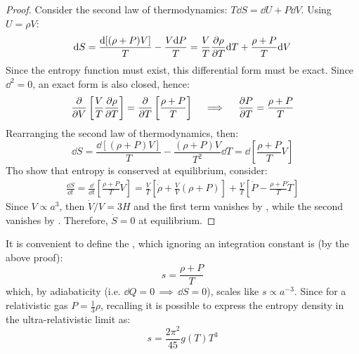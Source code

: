 \begin{proofbox}
  \begin{proof}
    Consider the second law of thermodynamics: $ T \dd S = \dd U + P \dd V $. Using $ U = \rho V $:
    \begin{equation*}
      \mathrm{d} S = \frac{\mathrm{d} [(\rho + P) V]}{T} - \frac{V \mathrm{d} P}{T} = \frac{V}{T} \frac{\partial \rho}{\partial T} \mathrm{d} T + \frac{\rho + P}{T} \mathrm{d} V
    \end{equation*}
    Since the entropy function must exist, this differential form must be exact. Since $ \dd^2 = 0 $, an exact form is also closed, hence:
    \begin{equation}
      \frac{\partial}{\partial V} \left[ \frac{V}{T} \frac{\partial \rho}{\partial T} \right] = \frac{\partial}{\partial T} \left[ \frac{\rho + P}{T} \right]
      \quad \implies \quad
      \frac{\partial P}{\partial T} = \frac{\rho + P}{T}
      \label{eq:pt-thermo}
    \end{equation}
    Rearranging the second law of thermodynamics, then:
    \begin{equation*}
      \dd S = \frac{\dd [(\rho + P) V]}{T} - \frac{(\rho + P) V}{T^2} \dd T = \dd \left[ \frac{\rho + P}{T} V \right]
    \end{equation*}
    Tho show that entropy is conserved at equilibrium, consider:
    \begin{equation*}
      \begin{split}
        \frac{\dd S}{\dd t} = \frac{\dd}{\dd t} \left[ \frac{\rho + P}{T} V \right] = \frac{V}{T} \left[ \dot{\rho} + \frac{\dot{V}}{V} (\rho + P) \right] + \frac{V}{T} \left[ \dot{P} - \frac{\rho + P}{T} \dot{T} \right]
      \end{split}
    \end{equation*}
    Since $ V \propto a^3 $, then $ \dot{V} / V = 3H $ and the first term vanishes by , while the second vanishes by . Therefore, $ \dot{S} = 0 $ at equilibrium.
  \end{proof}
\end{proofbox}

It is convenient to define the , which ignoring an integration constant is (by the above proof):
\begin{equation}
  s = \frac{\rho + P}{T}
\end{equation}
which, by adiabaticity (i.e. $ \dd Q = 0 \, \implies \, \dd S = 0 $), scales like $ s \propto a^{-3} $. Since for a relativistic gas $ P = \frac{1}{3} \rho $, recalling  it is possible to express the entropy density in the ultra-relativistic limit as:
\begin{equation}
  s = \frac{2\pi^2}{45} g(T) T^3
\end{equation}

